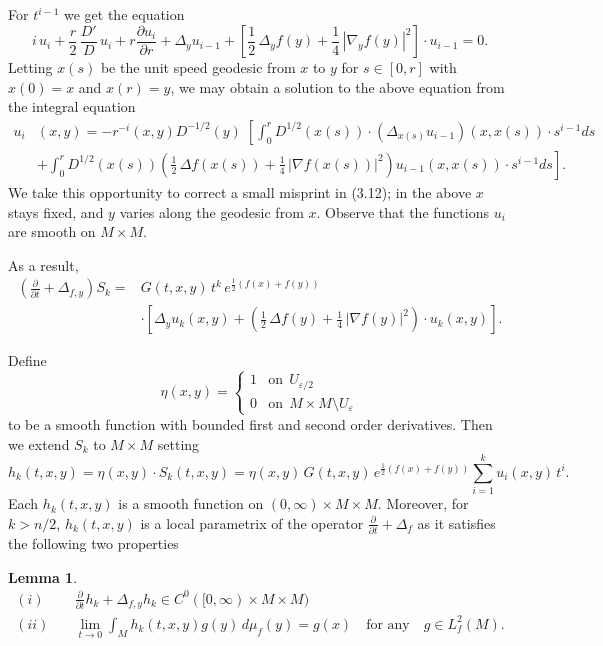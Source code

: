 \documentclass[letterpaper,12pt]{amsart}
\newtheorem{lem}[thm]{Lemma}
\newcommand{\eps}{\varepsilon}
\def \p{\partial}
\def \n{\nabla}
\def \n{\nabla}
\begin{document}
For $t^{i-1}$ we get the equation
\[
i \, u_i + \frac{r}{2}\, \frac{D'}{D} \, u_i + r \frac {\p u_i}{\p r} + \Delta_y u_{i-1} +  \left[ \frac 12 \, \Delta_y f (y) + \frac 14 \, |\n_y f(y)|^2 \right]  \cdot u_{i-1} =0.
\]
Letting $x(s)$ be the unit speed geodesic from $x$ to $y$ for $s\in [0,r]$ with $x(0)=x$ and  $x(r)=y$, we may obtain a solution to the above equation from the integral equation
\begin{equation} \label{u_i}
\begin{split}
u_i&(x,y)  = - r^{-i}(x,y) D^{-1/2}(y) \;  \left[  \int_0^r D^{1/2}(x(s))  \cdot   (\Delta_{x(s)} u_{i-1}) (x,x(s)) \cdot s^{i-1} ds \right.\\
&+ \left.   \int_0^r D^{1/2}(x(s)) \left( \frac 12 \, \Delta f (x(s)) + \frac 14 \, |\n f(x(s))|^2 \right)  u_{i-1}(x,x(s)) \cdot s^{i-1} ds \right].
\end{split}
\end{equation}
We take this opportunity to correct a small misprint in \cite{Ro} (3.12); in the above $x$ stays fixed, and $y$ varies along the geodesic from $x$. Observe that the functions $u_i$ are smooth on $M\times M$.

As a result,
\begin{equation} \label{heat2}
\begin{split}
 \left( \frac{\p}{\p t} + \Delta_{f,y} \right)   S_k  = &   G(t,x,y) \, t^k  \, e^{\frac{1}{2} (f(x)+f(y))}  \\
 &  \cdot  \left[  \Delta_y u_k (x,y)   +  \left(\frac 12 \, \Delta f (y) + \frac 14 \, |\n f(y)|^2\right) \cdot u_k(x,y)\right].
\end{split}
\end{equation}


Define
\begin{equation*}
\eta(x,y)= \left\{
\begin{array}{cc}
   1 & \text{on} \ \ U_{\eps/2} \\
0 &  \text{on} \ \ M\times M \setminus U_{\eps}
\end{array}\right.
\end{equation*}
to be a smooth function with bounded first and second order derivatives. Then we extend $S_k$ to $M\times M$ setting
\begin{equation} \label{Hk}
h_k(t,x,y) = \eta(x,y) \cdot S_k(t,x,y) = \eta(x,y) \, G(t,x,y) \,e^{\frac 12 (f(x)+f(y))} \sum_{i=1}^k u_i(x,y)\, t^i.
\end{equation}
Each $h_k(t,x,y)$ is a smooth function on $(0,\infty) \times M \times M$.  Moreover, for $k>n/2$, $h_k(t,x,y)$ is a local parametrix of the operator $\frac{\p}{\p t} +\Delta_f$ as it satisfies the following two properties
\begin{lem}
\begin{equation*}
\begin{split}
(i) & \quad \frac{\p}{\p t} h_k +\Delta_{f,y}  h_k  \in C^0([0,\infty)\times M \times M) \\
(ii) &  \quad \lim_{t \to 0} \int_M  h_k(t,x,y) g(y) \,  d\mu_f (y) = g(x) \quad  \text{for any} \quad  g\in L^2_f(M).
\end{split}
\end{equation*}
\end{lem}
\end{document}
